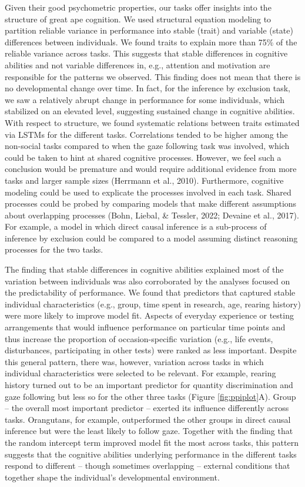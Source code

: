 \documentclass[
  man,floatsintext]{apa6}
\begin{document}
Given their good psychometric properties, our tasks offer insights into the structure of great ape cognition. We used structural equation modeling to partition reliable variance in performance into stable (trait) and variable (state) differences between individuals. We found traits to explain more than 75\% of the reliable variance across tasks. This suggests that stable differences in cognitive abilities and not variable differences in, e.g., attention and motivation are responsible for the patterns we observed. This finding does not mean that there is no developmental change over time. In fact, for the inference by exclusion task, we saw a relatively abrupt change in performance for some individuals, which stabilized on an elevated level, suggesting sustained change in cognitive abilities. With respect to structure, we found systematic relations between traits estimated via LSTMs for the different tasks. Correlations tended to be higher among the non-social tasks compared to when the gaze following task was involved, which could be taken to hint at shared cognitive processes. However, we feel such a conclusion would be premature and would require additional evidence from more tasks and larger sample sizes (Herrmann et al., 2010). Furthermore, cognitive modeling could be used to explicate the processes involved in each task. Shared processes could be probed by comparing models that make different assumptions about overlapping processes (Bohn, Liebal, \& Tessler, 2022; Devaine et al., 2017). For example, a model in which direct causal inference is a sub-process of inference by exclusion could be compared to a model assuming distinct reasoning processes for the two tasks.

The finding that stable differences in cognitive abilities explained most of the variation between individuals was also corroborated by the analyses focused on the predictability of performance. We found that predictors that captured stable individual characteristics (e.g., group, time spent in research, age, rearing history) were more likely to improve model fit. Aspects of everyday experience or testing arrangements that would influence performance on particular time points and thus increase the proportion of occasion-specific variation (e.g., life events, disturbances, participating in other tests) were ranked as less important. Despite this general pattern, there was, however, variation across tasks in which individual characteristics were selected to be relevant. For example, rearing history turned out to be an important predictor for quantity discrimination and gaze following but less so for the other three tasks (Figure \ref{fig:ppiplot}A). Group -- the overall most important predictor -- exerted its influence differently across tasks. Orangutans, for example, outperformed the other groups in direct causal inference but were the least likely to follow gaze. Together with the finding that the random intercept term improved model fit the most across tasks, this pattern suggests that the cognitive abilities underlying performance in the different tasks respond to different -- though sometimes overlapping -- external conditions that together shape the individual's developmental environment.
\end{document}

